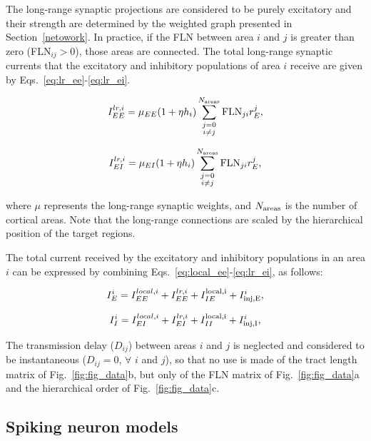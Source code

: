 The long-range synaptic projections are considered to be purely excitatory and their strength are determined by the weighted graph presented in Section~\ref{netowork}. In practice, if the FLN between area $i$ and $j$ is greater than zero (FLN$_{ij} > 0$), those areas are connected. The total long-range synaptic currents that the excitatory and inhibitory populations of area $i$ receive are given by Eqs.~\ref{eq:lr_ee}-\ref{eq:lr_ei}.

\begin{equation}
    I^{lr,i}_{EE} = \mu_{EE}(1+\eta h_{i})\sum_{\substack{j = 0\\i \ne j}}^{N_{\rm areas}}\text{FLN}_{ji}r_{E}^{j},
    \label{eq:lr_ee}
\end{equation}

\begin{equation}
    I^{lr,i}_{EI} = \mu_{EI}(1+\eta h_{i})\sum_{\substack{j = 0\\i \ne j}}^{N_{\rm areas}}\text{FLN}_{ji}r_{E}^{j},
    \label{eq:lr_ei}
\end{equation}

\noindent where $\mu$  represents the long-range synaptic weights, and $N_{\rm areas}$ is the number of cortical areas. Note that the long-range connections are scaled by the hierarchical position of the target regions.

The total current received by the excitatory and inhibitory populations in an area $i$ can be expressed by combining Eqs.~\ref{eq:local_ee}-\ref{eq:lr_ei}, as follows:

\begin{equation}
    I^{i}_{E} = I_{EE}^{local,i} + I^{lr,i}_{EE} + I^{\rm local,i}_{IE} + I_{\rm inj, E}^{i},
    \label{eq:total_current_e}
\end{equation}

\begin{equation}
    I^{i}_{I} = I_{EI}^{local,i} + I^{lr,i}_{EI} + I^{\rm local,i}_{II} + I_{\rm inj, I}^{i},
    \label{eq:total_current_i}
\end{equation}

The transmission delay ($D_{ij}$) between areas $i$ and $j$ is neglected and considered to be instantaneous ($D_{ij}=0$, $\forall$  $i$ and $j$), so that no use is made of the tract length matrix of Fig.~\ref{fig:fig_data}b, but only of the FLN matrix of Fig.~\ref{fig:fig_data}a and the hierarchical order of Fig.~\ref{fig:fig_data}c. 


\subsection{Spiking neuron models}\label{spike_model}

